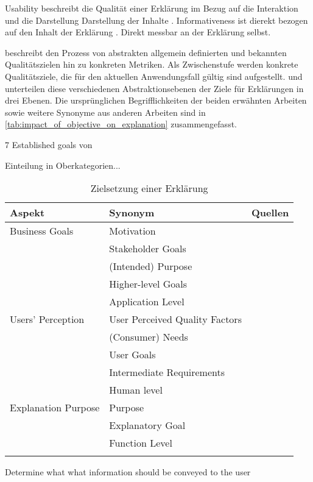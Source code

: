 Usability beschreibt die Qualität einer Erklärung im Bezug auf die Interaktion und die Darstellung Darstellung der Inhalte \cite{chazette_end-users_nodate}. Informativeness ist dierekt bezogen auf den Inhalt der Erklärung \cite{chazette_end-users_nodate}. Direkt messbar an der Erklärung selbst.

\cite{schneider2012abenteuer} beschreibt den Prozess von abstrakten allgemein definierten und bekannten Qualitätszielen hin zu konkreten Metriken. Als Zwischenstufe werden konkrete Qualitätsziele, die für den aktuellen Anwendungsfall gültig sind aufgestellt. \cite{nunes_systematic_2017} und \cite{waa_evaluating_2021} unterteilen diese verschiedenen Abstraktionsebenen der Ziele für Erklärungen in drei Ebenen. Die ursprünglichen Begrifflichkeiten der beiden erwähnten Arbeiten sowie weitere Synonyme aus anderen Arbeiten sind in \autoref{tab:impact_of_objective_on_explanation} zusammengefasst.

7 Established goals von \cite{tintarev2015explaining, tintarev_designing_nodate}

Einteilung in Oberkategorien...

\begin{longtable}{|p{}|p{}|p{}|}
    \hline
    \textbf{Aspekt}     & \textbf{Synonym} & \textbf{Quellen} \\ \hline
    Business Goals      & Motivation & \cite{nunes_systematic_2017} \\
                        & Stakeholder Goals & \cite{nunes_systematic_2017} \\
                        & (Intended) Purpose & \cite{waa_evaluating_2021} \\
                        & Higher-level Goals & \cite{nunes_systematic_2017} \\
                        & Application Level & \cite{sokol_explainability_2020} \\
    \hline
    Users' Perception   & User Perceived Quality Factors & \cite{nunes_systematic_2017} \\
                        & (Consumer) Needs & \cite{ehsan_human-centered_2020} \cite{chazette_end-users_nodate} \\
                        & User Goals & \cite{ehsan_human-centered_2020} \\
                        & Intermediate Requirements & \cite{waa_evaluating_2021} \\
                        & Human level & \cite{sokol_explainability_2020} \\
                        
    \hline
    Explanation Purpose & Purpose & \cite{nunes_systematic_2017} \\
                        & Explanatory Goal & \cite{tintarev_designing_nodate} \cite{balog_measuring_2020} \\
                        & Function Level & \cite{sokol_explainability_2020} \\
    \hline
\caption{Zielsetzung einer Erklärung}
\label{tab:impact_of_objective_on_explanation}
\end{longtable}

Determine what what information should be conveyed to the user \cite{nunes_systematic_2017}